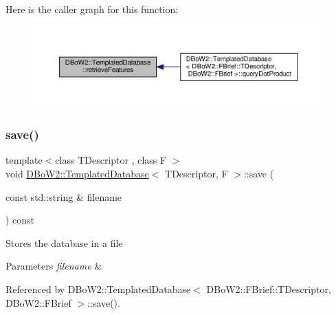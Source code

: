 Here is the caller graph for this function\+:\nopagebreak
\begin{figure}[H]
\begin{center}
\leavevmode
\includegraphics[width=350pt]{classDBoW2_1_1TemplatedDatabase_ac6501f207868c7466322827a59c6eb3e_icgraph}
\end{center}
\end{figure}
\mbox{\label{classDBoW2_1_1TemplatedDatabase_a7162dee10a5602c309729900bff52ead}} 
\subsubsection{\texorpdfstring{save()}{save()}\hspace{0.1cm}{\footnotesize\ttfamily [1/2]}}
{\footnotesize\ttfamily template$<$class T\+Descriptor , class F $>$ \\
void \hyperlink{classDBoW2_1_1TemplatedDatabase}{D\+Bo\+W2\+::\+Templated\+Database}$<$ T\+Descriptor, F $>$\+::save (\begin{DoxyParamCaption}\item[{const std\+::string \&}]{filename }\end{DoxyParamCaption}) const}

Stores the database in a file 
\begin{DoxyParams}{Parameters}
{\em filename} & \\
\hline
\end{DoxyParams}


Referenced by D\+Bo\+W2\+::\+Templated\+Database$<$ D\+Bo\+W2\+::\+F\+Brief\+::\+T\+Descriptor, D\+Bo\+W2\+::\+F\+Brief $>$\+::save().

